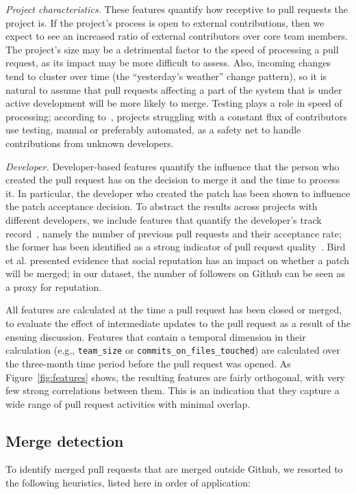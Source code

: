 \documentclass{sig-alternate}
\begin{document}
  \emph{Project characteristics.} These features quantify how receptive to pull
  requests the project is. If the project's process is open to external
  contributions, then we expect to see an increased ratio of external
  contributors over core team members. The project's size may be a detrimental
  factor to the speed of processing a pull request, as its impact may be more
  difficult to assess. Also, incoming changes tend to cluster over time (the
  ``yesterday's weather'' change pattern), so it is natural to
  assume that pull requests affecting a part of the system that is under active
  development will be more likely to merge. Testing plays a role in speed of
  processing; according to~\cite{Pham13}, projects struggling with a constant
  flux of contributors use testing, manual or preferably automated, as a safety
  net to handle contributions from unknown developers.

  \emph{Developer.}  Developer-based features quantify the influence that the
  person who created the pull request has on the decision to merge it and the
  time to process it. In particular, the developer who created the patch has
  been shown to influence the patch acceptance decision. To
  abstract the results across projects with different developers, we include
  features that quantify the developer's track record~\cite{Dabbi12}, namely the
  number of previous pull requests and their acceptance rate; the former has
  been identified as a strong indicator of pull request quality~\cite{Pham13}.
  Bird et al. presented evidence that social reputation has an
  impact on whether a patch will be merged; in our dataset, the number of
  followers on Github can be seen as a proxy for reputation.

All features are calculated at the time a pull request has been closed or
merged, to evaluate the effect of intermediate updates to the pull request as a
result of the ensuing discussion. Features that contain a temporal dimension in
their calculation (e.g., \texttt{team\_size} or
\texttt{commits\_on\_files\_touched}) are calculated over the three-month time
period before the pull request was opened. As Figure~\ref{fig:features} shows,
the resulting features are fairly orthogonal, with very few strong correlations
between them. This is an indication that they capture a wide range of pull
request activities with minimal overlap.



\subsection{Merge detection}
\label{sec:mergedec}
To identify merged pull requests that are merged outside Github, we resorted to
the following heuristics, listed here in order of application:
\end{document}
